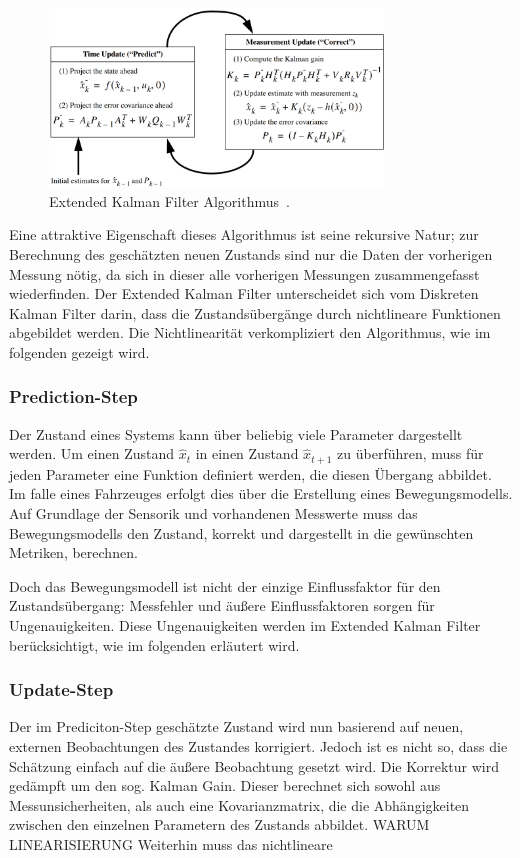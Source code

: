 \documentclass[11pt]{article}
\begin{document}
\begin{figure}[!t]
	\centering
	\includegraphics[width=3.5in]{EKF_algorithm.png}
	\caption{Extended Kalman Filter Algorithmus~\cite{EKF_course}.}
	\label{EKF-Algorithmus}
\end{figure}

Eine attraktive Eigenschaft dieses Algorithmus ist seine rekursive Natur; zur Berechnung des geschätzten neuen Zustands sind nur die Daten der vorherigen Messung nötig, da sich  in dieser alle vorherigen Messungen zusammengefasst wiederfinden. Der Extended Kalman Filter unterscheidet sich vom Diskreten Kalman Filter darin, dass die Zustandsübergänge durch nichtlineare Funktionen abgebildet werden. Die Nichtlinearität verkompliziert den Algorithmus, wie im folgenden gezeigt wird.

\subsubsection{Prediction-Step}
Der Zustand eines Systems kann über beliebig viele Parameter dargestellt werden. Um einen Zustand $\hat{x}_t$ in einen Zustand $\hat{x}_{t+1}$ zu überführen, muss für jeden Parameter eine Funktion definiert werden, die diesen Übergang abbildet. Im falle eines Fahrzeuges erfolgt dies über die Erstellung eines Bewegungsmodells. Auf Grundlage der Sensorik und vorhandenen Messwerte muss das Bewegungsmodells den Zustand, korrekt und dargestellt in die gewünschten Metriken, berechnen.

Doch das Bewegungsmodell ist nicht der einzige Einflussfaktor für den Zustandsübergang: Messfehler und äußere Einflussfaktoren sorgen für Ungenauigkeiten. Diese Ungenauigkeiten werden im Extended Kalman Filter berücksichtigt, wie im folgenden erläutert wird.

\subsubsection{Update-Step}
Der im Prediciton-Step geschätzte Zustand wird nun basierend auf neuen, externen Beobachtungen des Zustandes korrigiert. Jedoch ist es nicht so, dass die Schätzung einfach auf die äußere Beobachtung gesetzt wird. Die Korrektur wird gedämpft um den sog. Kalman Gain. Dieser berechnet sich sowohl aus Messunsicherheiten, als auch eine Kovarianzmatrix, die die Abhängigkeiten zwischen den einzelnen Parametern des Zustands abbildet. WARUM LINEARISIERUNG Weiterhin muss das nichtlineare 
\end{document}
